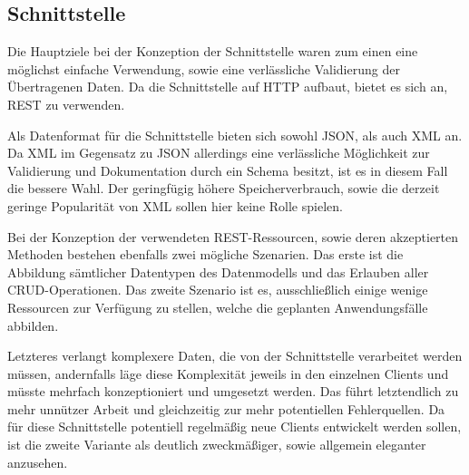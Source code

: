 \subsection{Schnittstelle}
Die Hauptziele bei der Konzeption der Schnittstelle waren zum einen eine möglichst
einfache Verwendung, sowie eine verlässliche Validierung der Übertragenen Daten.
Da die Schnittstelle auf HTTP aufbaut, bietet es sich an, REST zu verwenden.

Als Datenformat für die Schnittstelle bieten sich sowohl JSON, als auch XML an.
Da XML im Gegensatz zu JSON allerdings eine verlässliche Möglichkeit zur Validierung
und Dokumentation durch ein Schema besitzt, ist es in diesem Fall die bessere Wahl.
Der geringfügig höhere Speicherverbrauch, sowie die derzeit geringe Popularität
von XML sollen hier keine Rolle spielen.

Bei der Konzeption der verwendeten REST-Ressourcen, sowie deren akzeptierten Methoden
bestehen ebenfalls zwei mögliche Szenarien. Das erste ist die Abbildung sämtlicher
Datentypen des Datenmodells und das Erlauben aller CRUD-Operationen.
Das zweite Szenario ist es, ausschließlich einige wenige Ressourcen zur Verfügung
zu stellen, welche die geplanten Anwendungsfälle abbilden.

Letzteres verlangt komplexere Daten, die von der Schnittstelle verarbeitet werden müssen,
andernfalls läge diese Komplexität jeweils in den einzelnen Clients und müsste
mehrfach konzeptioniert und umgesetzt werden. Das führt letztendlich zu mehr
unnützer Arbeit und gleichzeitig zur mehr potentiellen Fehlerquellen.
Da für diese Schnittstelle potentiell regelmäßig neue Clients entwickelt werden sollen,
ist die zweite Variante als deutlich zweckmäßiger, sowie allgemein eleganter anzusehen.